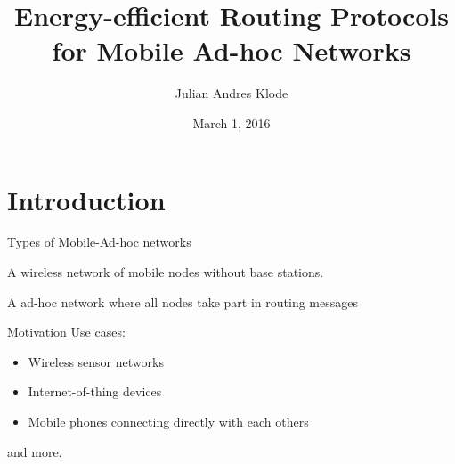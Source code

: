\documentclass{beamer}
\title{Energy-efficient Routing Protocols for Mobile Ad-hoc Networks}
\author{Julian Andres Klode}
\date{March 1, 2016}
\begin{document}
\maketitle


\section{Introduction}
\frame{\tableofcontents[currentsection]}
\begin{frame}{Types of Mobile-Ad-hoc networks}
  \begin{Definition}
    A wireless network of mobile nodes without base stations.
  \end{Definition}
  \begin{Definition}
    A ad-hoc network where all nodes take part in routing messages
  \end{Definition}
\end{frame}
\begin{frame}{Motivation}
  Use cases:

  \begin{itemize}
      \item Wireless sensor networks
      \item Internet-of-thing devices
      \item Mobile phones connecting directly with each others
  \end{itemize}

  and more.
\end{frame}
\end{document}
